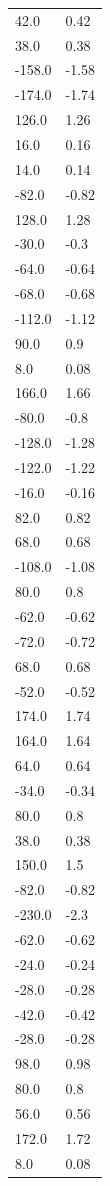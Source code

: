 \begin{longtable}{ll}
42.0 & 0.42 \\
38.0 & 0.38 \\
-158.0 & -1.58 \\
-174.0 & -1.74 \\
126.0 & 1.26 \\
16.0 & 0.16 \\
14.0 & 0.14 \\
-82.0 & -0.82 \\
128.0 & 1.28 \\
-30.0 & -0.3 \\
-64.0 & -0.64 \\
-68.0 & -0.68 \\
-112.0 & -1.12 \\
90.0 & 0.9 \\
8.0 & 0.08 \\
166.0 & 1.66 \\
-80.0 & -0.8 \\
-128.0 & -1.28 \\
-122.0 & -1.22 \\
-16.0 & -0.16 \\
82.0 & 0.82 \\
68.0 & 0.68 \\
-108.0 & -1.08 \\
80.0 & 0.8 \\
-62.0 & -0.62 \\
-72.0 & -0.72 \\
68.0 & 0.68 \\
-52.0 & -0.52 \\
174.0 & 1.74 \\
164.0 & 1.64 \\
64.0 & 0.64 \\
-34.0 & -0.34 \\
80.0 & 0.8 \\
38.0 & 0.38 \\
150.0 & 1.5 \\
-82.0 & -0.82 \\
-230.0 & -2.3 \\
-62.0 & -0.62 \\
-24.0 & -0.24 \\
-28.0 & -0.28 \\
-42.0 & -0.42 \\
-28.0 & -0.28 \\
98.0 & 0.98 \\
80.0 & 0.8 \\
56.0 & 0.56 \\
172.0 & 1.72 \\
8.0 & 0.08 \\

\end{longtable}
